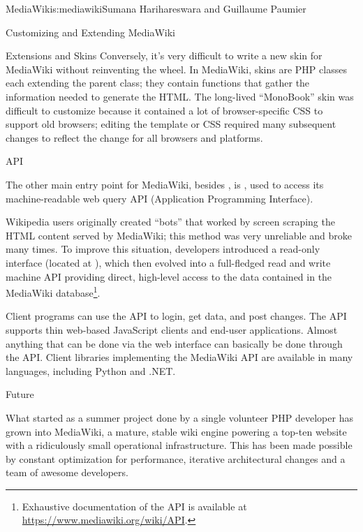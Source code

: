 \begin{aosachapter}{MediaWiki}{s:mediawiki}{Sumana Harihareswara and Guillaume Paumier}
\begin{aosasect1}{Customizing and Extending MediaWiki}
\begin{aosasect2}{Extensions and Skins}
Conversely, it's very difficult to write a new skin for MediaWiki
without reinventing the wheel. In MediaWiki, skins are PHP classes
each extending the parent  class; they contain functions
that gather the information needed to generate the HTML. The
long-lived ``MonoBook'' skin was difficult to customize because it
contained a lot of browser-specific CSS to support old browsers;
editing the template or CSS required many subsequent changes to
reflect the change for all browsers and platforms.

\end{aosasect2}

\begin{aosasect2}{API}

The other main entry point for MediaWiki, besides , is
, used to access its machine-readable web query API
(Application Programming Interface).

Wikipedia users originally created ``bots'' that worked by screen
scraping the HTML content served by MediaWiki; this method was very
unreliable and broke many times. To improve this situation, developers
introduced a read-only interface (located at ), which
then evolved into a full-fledged read and write machine API providing
direct, high-level access to the data contained in the MediaWiki
database\footnote{Exhaustive documentation of the API is available at
  \url{https://www.mediawiki.org/wiki/API}.}.

Client programs can use the API to login, get data, and post
changes. The API supports thin web-based JavaScript clients and
end-user applications. Almost anything that can be done via the web
interface can basically be done through the API. Client libraries
implementing the MediaWiki API are available in many languages,
including Python and .NET.

\end{aosasect2}

\end{aosasect1}

\begin{aosasect1}{Future}

What started as a summer project done by a single volunteer PHP
developer has grown into MediaWiki, a mature, stable wiki engine
powering a top-ten website with a ridiculously small operational
infrastructure. This has been made possible by constant optimization
for performance, iterative architectural changes and a team of awesome
developers.


\end{aosasect1}
\end{aosachapter}
